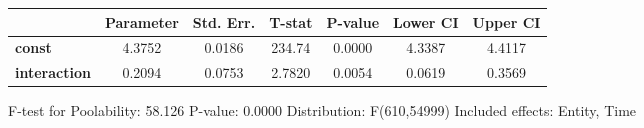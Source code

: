 \begin{center}
\begin{tabular}{lclc}
\end{tabular}
\begin{tabular}{lcccccc}
                     & \textbf{Parameter} & \textbf{Std. Err.} & \textbf{T-stat} & \textbf{P-value} & \textbf{Lower CI} & \textbf{Upper CI}  \\
\midrule
\textbf{const}       &       4.3752       &       0.0186       &      234.74     &      0.0000      &       4.3387      &       4.4117       \\
\textbf{interaction} &       0.2094       &       0.0753       &      2.7820     &      0.0054      &       0.0619      &       0.3569       \\
\bottomrule
\end{tabular}
\end{center}

F-test for Poolability: 58.126 \newline
 P-value: 0.0000 \newline
 Distribution: F(610,54999) \newline
  \newline
 Included effects: Entity, Time